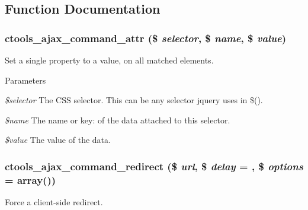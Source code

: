 \subsection{Function Documentation}
\hypertarget{ctools_2includes_2ajax_8inc_a598e0895893a1295ec95964a2a7e97d8}{
\subsubsection[{ctools\_\-ajax\_\-command\_\-attr}]{\setlength{\rightskip}{0pt plus 5cm}ctools\_\-ajax\_\-command\_\-attr (\$ {\em selector}, \/  \$ {\em name}, \/  \$ {\em value})}}
\label{ctools_2includes_2ajax_8inc_a598e0895893a1295ec95964a2a7e97d8}
Set a single property to a value, on all matched elements.


\begin{DoxyParams}{Parameters}
\item[{\em \$selector}]The CSS selector. This can be any selector jquery uses in \$(). \item[{\em \$name}]The name or key: of the data attached to this selector. \item[{\em \$value}]The value of the data. \end{DoxyParams}
\hypertarget{ctools_2includes_2ajax_8inc_a5f3e0560404a0fbd02f118c1f7408e24}{
\subsubsection[{ctools\_\-ajax\_\-command\_\-redirect}]{\setlength{\rightskip}{0pt plus 5cm}ctools\_\-ajax\_\-command\_\-redirect (\$ {\em url}, \/  \$ {\em delay} = {}, \/  \$ {\em options} = {\ttfamily array()})}}
\label{ctools_2includes_2ajax_8inc_a5f3e0560404a0fbd02f118c1f7408e24}
Force a client-\/side redirect.


